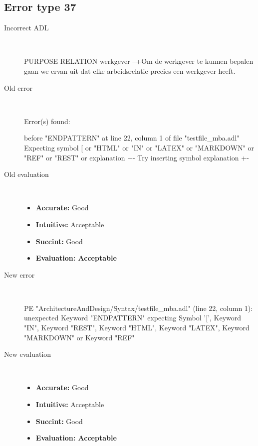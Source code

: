 \subsection{Error type 37}
  \begin{description}
  \item[Incorrect ADL]~\\
\begin{adl}
PURPOSE RELATION werkgever
--{+Om de werkgever te kunnen bepalen gaan we ervan uit dat elke arbeidsrelatie precies een werkgever heeft.-}\end{adl}
  \item[Old error]~\\
\begin{haskell}
Error(s) found:

before "ENDPATTERN" at line 22, column 1 of file "testfile_mba.adl"
Expecting symbol [ or "HTML" or "IN" or "LATEX" or "MARKDOWN" or "REF" or "REST"
 or explanation {+-}
Try inserting symbol explanation {+-}
\end{haskell}
  \item[Old evaluation]~\\
    \begin{itemize}
    \item \textbf{Accurate:} Good
    \item \textbf{Intuitive:} Acceptable
    \item \textbf{Succint:} Good
    \item \textbf{Evaluation: Acceptable}
    \end{itemize}
  \item[New error]~\\
\begin{haskell}
PE "ArchitectureAndDesign/Syntax/testfile_mba.adl" (line 22, column 1):
unexpected Keyword "ENDPATTERN"
expecting Symbol '[', Keyword "IN", Keyword "REST", Keyword "HTML", Keyword "LATEX", Keyword "MARKDOWN" or Keyword "REF"\end{haskell}
  \item[New evaluation]~\\
    \begin{itemize}
    \item \textbf{Accurate:} Good
    \item \textbf{Intuitive:} Acceptable
    \item \textbf{Succint:} Good
    \item \textbf{Evaluation: Acceptable
}
    \end{itemize}
  \end{description}

